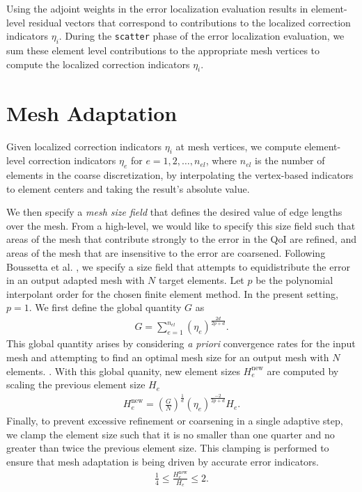 Using the adjoint weights in the error localization evaluation results in
element-level residual vectors that correspond to contributions to the
localized correction indicators $\eta_i$.
During the \texttt{scatter} phase of the error localization evaluation, we
sum these element level contributions to the appropriate mesh vertices
to compute the localized correction indicators $\eta_i$.

\section{Mesh Adaptation}

Given localized correction indicators $\eta_i$ at mesh
vertices, we compute element-level correction indicators $\eta_e$ for
$e = 1,2,\dots, n_{el}$, where $n_{el}$ is the number of elements in the
coarse discretization, by interpolating the vertex-based indicators to
element centers and taking the result's absolute value.

We then specify a \emph{mesh size field} that defines the desired value
of edge lengths over the mesh. From a high-level, we would like to specify
this size field such that areas of the mesh that contribute strongly to
the error in the QoI are refined, and areas of the mesh that are
insensitive to the error are coarsened. Following Boussetta et al.
\cite{boussetta2006adaptive}, we specify a size field that attempts to
equidistribute the error in an output adapted mesh with $N$ target
elements. Let $p$ be the polynomial interpolant order for the chosen
finite element method. In the present setting, $p=1$. We first define
the global quantity $G$ as
%
\begin{gather}
G = \sum_{e=1}^{n_{el}} ( \eta_e ) ^{\frac{2d}{2p+d}}.
\label{eq:aut_global_size_quantity}
\end{gather}
%
This global quantity arises by considering \emph{a priori} convergence
rates for the input mesh and attempting to find an optimal mesh size
for an output mesh with $N$ elements. \cite{boussetta2006adaptive}.
With this global quanity, new element sizes $H_e^{\text{new}}$ are
computed by scaling the previous element size $H_e$
%
\begin{gather}
H_e^{\text{new}} = \left( \frac{G}{N} \right)^{\frac{1}{d}}
( \eta_e )^{\frac{-2}{2p + d}} H_e.
\label{eq:aut_size_field}
\end{gather}
%
Finally, to prevent excessive refinement or coarsening in a single
adaptive step, we clamp the element size such that it is no
smaller than one quarter and no greater than twice the previous
element size. This clamping is performed to ensure that mesh adaptation
is being driven by accurate error indicators.
%
\begin{gather}
\frac14 \leq \frac{H_e^{\text{new}}}{H_e} \leq 2.
\label{eq:aut_size_clamping}
\end{gather}

